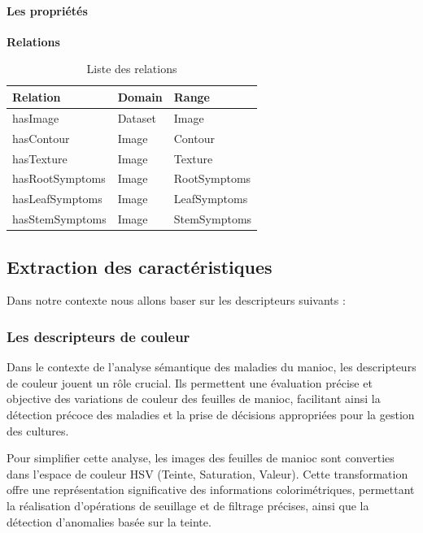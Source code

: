 \FloatBarrier

\paragraph{Les propriétés}
\noindent\textbf{Relations}
\begin{table}[H]
	\centering
	\begin{tabular}{|p{5cm}|p{5cm}|p{5cm}|}
		\hline
		\textbf{Relation} & \textbf{Domain} & \textbf{Range} \\
		\hline
		hasImage & Dataset & Image \\
		\hline
		hasContour & Image & Contour \\
		\hline
		hasTexture & Image & Texture \\
		\hline
		hasRootSymptoms & Image & RootSymptoms \\
		\hline
		hasLeafSymptoms & Image & LeafSymptoms \\
		\hline
		hasStemSymptoms & Image & StemSymptoms \\
		\hline
	\end{tabular}
	\caption{Liste des relations}
\end{table}

\FloatBarrier

\subsection{Extraction des caractéristiques}
Dans notre contexte nous allons baser sur les descripteurs suivants :

\subsubsection{Les descripteurs de couleur}
Dans le contexte de l'analyse sémantique des maladies du manioc, les descripteurs de couleur jouent un rôle crucial. Ils permettent une évaluation précise et objective des variations de couleur des feuilles de manioc, facilitant ainsi la détection précoce des maladies et la prise de décisions appropriées pour la gestion des cultures.

Pour simplifier cette analyse, les images des feuilles de manioc sont converties dans l'espace de couleur HSV (Teinte, Saturation, Valeur). Cette transformation offre une représentation significative des informations colorimétriques, permettant la réalisation d'opérations de seuillage et de filtrage précises, ainsi que la détection d'anomalies basée sur la teinte.

